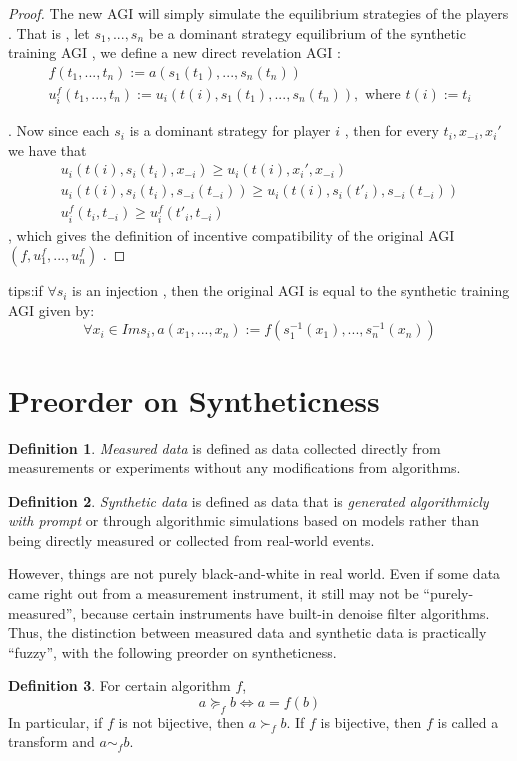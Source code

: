\documentclass[10pt,reqno]{amsart}
\theoremstyle{definition}
\newtheorem{defn}{Definition}[section]
\theoremstyle{remark}
\numberwithin{equation}{section}
\begin{document}
\begin{proof}
The new AGI will simply simulate the equilibrium strategies of the players . That is , let $s_1,...,s_n$ be a dominant strategy equilibrium of the synthetic training AGI , we define a new direct revelation AGI : 
\begin{eqnarray}
f(t_1,...,t_n):=a(s_1(t_1),...,s_n(t_n)) \\
 u_i^f(t_1,...,t_n):=u_i(t(i), s_1(t_1),...,s_n(t_n)), \text{ where } t(i) := t_i
\end{eqnarray}

 . Now since each $s_i$ is a dominant strategy for player $i$ , then for every $t_i,x_{-i},x_i'$ we have that 
\begin{eqnarray}
 u_i(t(i),   s_i(t_i),x_{-i})\ge u_i(t(i),x_i',x_{-i})\\
 u_i\left(t(i),   s_i(t_i),s_{-i}(t_{-i})  \right) \ge  u_i\left(t(i),   s_i(t'_i),s_{-i}(t_{-i})  \right) \\
 u_i^f(t_i,t_{-i} )\geq u_i^f(t'_i,t_{-i} )
\end{eqnarray}
, which gives the definition of incentive compatibility of the original AGI $(f,u_1^f,...,u_n^f)$ .

\end{proof}

tips:if $\forall s_i$ is an injection , then the original AGI is equal to the synthetic training AGI given by:
$$\forall x_i\in Ims_i,a(x_1,...,x_n):=f(s_1^{-1}(x_1),...,s_n^{-1}(x_n))$$

\section{Preorder on Syntheticness}
\begin{defn}
\emph{Measured data} is defined as data collected directly from measurements or experiments without any modifications from algorithms.
\end{defn}

\begin{defn}
\emph{Synthetic data} is defined as data that is \emph{generated algorithmicly with prompt} or through algorithmic simulations based on models rather than being directly measured or collected from real-world events.
\end{defn}


However, things are not purely black-and-white in real world. Even if some data came right out from a measurement instrument, it still may not be ``purely-measured'', because certain instruments have built-in denoise filter algorithms. Thus, the distinction between measured data and synthetic data is practically ``fuzzy'', with the following preorder on syntheticness. 
\begin{defn}
For certain algorithm $f$,
\begin{equation}
a \succeq_f b \iff  a = f(b)
\end{equation}
In particular, if $f$ is not bijective, then $a \succ_f b$. If $f$ is bijective, then $f$ is called a transform and $a\sim_f b$.
\end{defn}
\end{document}

